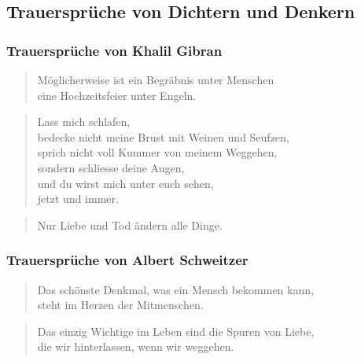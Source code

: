 \documentclass[ngerman,a4paper,11pt]{scrreprt}
\begin{document}
\subsection{Trauersprüche von Dichtern und Denkern}
\label{sec-1-1-1-3}

\subsubsection*{Trauersprüche von Khalil Gibran}
\label{sec-1-1-1-3-1}

\begin{verse}
Möglicherweise ist ein Begräbnis unter Menschen \\
eine Hochzeitsfeier unter Engeln. \\
\end{verse}

\begin{verse}
Lass mich schlafen, \\
bedecke nicht meine Brust mit Weinen und Seufzen, \\
sprich nicht voll Kummer von meinem Weggehen, \\
sondern schliesse deine Augen, \\
und du wirst mich unter euch sehen, \\
jetzt und immer. \\
\end{verse}

\begin{verse}
Nur Liebe und Tod ändern alle Dinge. \\
\end{verse}

\subsubsection*{Trauersprüche von Albert Schweitzer}
\label{sec-1-1-1-3-2}

\begin{verse}
Das schönste Denkmal, was ein Mensch bekommen kann, \\
steht im Herzen der Mitmenschen. \\
\end{verse}

\begin{verse}
Das einzig Wichtige im Leben sind die Spuren von Liebe, \\
die wir hinterlassen, wenn wir weggehen. \\
\end{verse}
\end{document}
